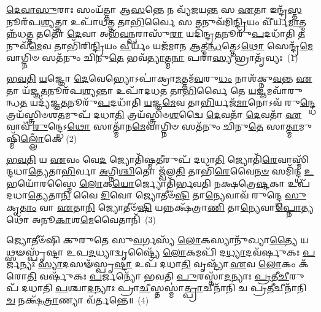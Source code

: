 \setcounter{anuvakam}{0}
\-\ul{𑌦𑍇}\-\-\ul{𑌵𑌾}\-\-\ul{𑌸𑍁}\-𑌰𑌾𑌃 𑌸𑌂𑌯᳴𑌤𑍍𑌤𑌾 𑌆\-\ul{𑌸}\-𑌨𑍍𑌤𑍇 𑌨 𑌵𑍍𑌯᳴𑌜𑌯\-\ul{𑌨𑍍𑌤} 𑌸 \ul{𑌏}\-𑌤𑌾 𑌇𑌨𑍍𑌦𑍍𑌰᳴\-\ul{𑌸𑍍𑌤}\-𑌨𑍂𑌰᳴𑌪\-\ul{𑌶𑍍𑌯}\-𑌤𑍍𑌤𑌾 𑌉𑌪𑌾᳴𑌧\-\ul{𑌤𑍍𑌤} 𑌤𑌾\-\ul{𑌭𑌿}\-𑌰𑍍𑌵𑍈 𑌸 \ul{𑌤}\-𑌨𑍁𑌵᳴𑌮𑌿\-\ul{𑌨𑍍𑌦𑍍𑌰𑌿}\-𑌯𑌂 𑌵𑍀᳴𑌰𑍍𑌯\-\ul{𑌮𑌾}\-𑌤𑍍𑌮𑌨𑍍𑌨᳴𑌧\-\ul{𑌤𑍍𑌤} 𑌤𑌤𑍋᳴ \ul{𑌦𑍇}\-𑌵𑌾 𑌅𑌭᳴\-\ul{𑌵}\-𑌨𑍍𑌪𑌰𑌾𑌸𑍁᳴\-\ul{𑌰𑌾} 𑌯𑌦𑌿᳴𑌨𑍍𑌦𑍍𑌰\-\ul{𑌤}\-𑌨𑍂𑌰𑍁᳴\-\ul{𑌪}\-𑌦𑌧𑌾᳴𑌤𑌿 \ul{𑌤}\-𑌨𑍁𑌵᳴\-\ul{𑌮𑍇}\-𑌵 𑌤𑌾𑌭𑌿᳴𑌰𑌿\-\ul{𑌨𑍍𑌦𑍍𑌰𑌿}\-𑌯𑌂 \ul{𑌵𑍀}\-𑌰𑍍𑌯𑌂᳴ 𑌯𑌜᳴𑌮𑌾𑌨 \ul{𑌆}\-𑌤𑍍𑌮\-\ul{𑌨𑍍𑌧}\-𑌤𑍍𑌤𑍇\-𑌽\-\ul{𑌥𑍋} 𑌸𑍇𑌨𑍍𑌦𑍍𑌰᳴\-\ul{𑌮𑍇}\-𑌵𑌾𑌗𑍍𑌨𑌿𑍞 𑌸𑌤᳴𑌨𑍁𑌂 𑌚𑌿𑌨𑍁\-\ul{𑌤𑍇} 𑌭𑌵᳴\-\ul{𑌤𑍍𑌯𑌾}\-𑌤𑍍𑌮\-\ul{𑌨𑌾} 𑌪𑌰𑌾॑\-\ul{𑌸𑍍𑌯} 𑌭𑍍𑌰𑌾𑌤𑍃᳴𑌵𑍍𑌯𑌃~(1)

\-\ul{𑌭}\-\-\ul{𑌵}\-\-\ul{𑌤𑌿} \ul{𑌯}\-𑌜𑍍𑌞𑍋 \ul{𑌦𑍇}\-𑌵𑍇𑌭𑍍𑌯𑍋\-𑌽𑌪𑌾॑𑌕𑍍𑌰𑌾\-\ul{𑌮}\-𑌤𑍍𑌤𑌮᳴\-\ul{𑌵}\-𑌰𑍁\-\ul{𑌧𑌂} 𑌨𑌾𑌶᳴𑌕𑍍𑌨𑍁\-\ul{𑌵}\-𑌨𑍍𑌤 \ul{𑌏}\-𑌤𑌾 𑌯᳴𑌜𑍍𑌞\-\ul{𑌤}\-𑌨𑍂𑌰᳴𑌪\-\ul{𑌶𑍍𑌯}\-𑌨𑍍𑌤𑌾 𑌉𑌪𑌾᳴𑌦𑌧\-\ul{𑌤} 𑌤𑌾\-\ul{𑌭𑌿}\-𑌰𑍍𑌵𑍈 𑌤𑍇 \ul{𑌯}\-𑌜𑍍𑌞𑌮𑌵𑌾᳴𑌰𑍁𑌨𑍍𑌧\-\ul{𑌤} 𑌯𑌦𑍍𑌯᳴𑌜𑍍𑌞\-\ul{𑌤}\-𑌨𑍂𑌰𑍁᳴\-\ul{𑌪}\-𑌦𑌧𑌾᳴𑌤𑌿 \ul{𑌯}\-𑌜𑍍𑌞\-\ul{𑌮𑍇}\-𑌵 𑌤𑌾\-\ul{𑌭𑌿}\-𑌰𑍍𑌯𑌜᳴\-\ul{𑌮𑌾}\-𑌨𑍋\-𑌽𑌵᳴ 𑌰𑍁\-\ul{𑌨𑍍𑌦𑍍𑌧𑍇} 𑌤𑍍𑌰𑌯᳴𑌸𑍍𑌤𑍍𑌰𑌿𑍞𑌶\-\ul{𑌤}\-𑌮𑍁𑌪᳴ 𑌦𑌧𑌾\-\ul{𑌤𑌿} 𑌤𑍍𑌰𑌯᳴𑌸𑍍𑌤𑍍𑌰𑌿𑍞\-\ul{𑌶}\-𑌦𑍍𑌵𑍈 \ul{𑌦𑍇}\-𑌵𑌤𑌾᳴ \ul{𑌦𑍇}\-𑌵𑌤𑌾᳴ \ul{𑌏}\-𑌵𑌾𑌵᳴ \ul{𑌰𑍁}\-𑌨𑍍𑌦𑍍𑌧𑍇\-𑌽\-\ul{𑌥𑍋} 𑌸𑌾𑌤𑍍𑌮𑌾᳴𑌨\-\ul{𑌮𑍇}\-𑌵𑌾𑌗𑍍𑌨𑌿𑍞 𑌸𑌤᳴𑌨𑍁𑌂 𑌚𑌿𑌨𑍁\-\ul{𑌤𑍇} 𑌸𑌾\-\ul{𑌤𑍍𑌮𑌾}\-𑌮𑍁𑌷𑍍𑌮𑌿᳴\-\ul{𑌲𑍍𑌲𑍋𑌁}\-𑌕𑍇~(2)

\-\ul{𑌭}\-\-\ul{𑌵}\-\-\ul{𑌤𑌿} 𑌯 \ul{𑌏}\-𑌵𑌂 𑌵𑍇\-\ul{𑌦} 𑌜𑍍𑌯𑍋𑌤𑌿᳴𑌷𑍍𑌮\-\ul{𑌤𑍀}\-𑌰𑍁𑌪᳴ 𑌦𑌧𑌾\-\ul{𑌤𑌿} 𑌜𑍍𑌯𑍋𑌤𑌿᳴\-\ul{𑌰𑍇}\-𑌵𑌾𑌸𑍍𑌮𑌿᳴𑌨𑍍𑌦𑌧𑌾\-\ul{𑌤𑍍𑌯𑍇}\-𑌤𑌾\-\ul{𑌭𑌿}\-𑌰𑍍𑌵𑌾 \ul{𑌅}\-𑌗𑍍𑌨𑌿\-\ul{𑌶𑍍𑌚𑌿}\-𑌤𑍋 𑌜𑍍𑌵᳴𑌲\-\ul{𑌤𑌿} 𑌤𑌾𑌭𑌿᳴\-\ul{𑌰𑍇}\-𑌵𑍈\-\ul{𑌨}\-\-\ul{𑍞} 𑌸𑌮𑌿᳴𑌨𑍍𑌦𑍍𑌧 \ul{𑌉}\-𑌭𑌯𑍋᳴𑌰𑌸𑍍𑌮𑍈 \ul{𑌲𑍋}\-𑌕\-\ul{𑌯𑍋}\-𑌰𑍍𑌜𑍍𑌯𑍋𑌤𑌿᳴𑌰𑍍𑌭𑌵𑌤𑌿 𑌨𑌕𑍍𑌷𑌤𑍍𑌰𑍇\-\ul{𑌷𑍍𑌟}\-𑌕𑌾 𑌉𑌪᳴ 𑌦𑌧𑌾\-\ul{𑌤𑍍𑌯𑍇}\-𑌤𑌾\-\ul{𑌨𑌿} 𑌵𑍈 \ul{𑌦𑌿}\-𑌵𑍋 𑌜𑍍𑌯𑍋𑌤𑍀𑍞᳴\-\ul{𑌷𑌿} 𑌤𑌾\-\ul{𑌨𑍍𑌯𑍇}\-𑌵𑌾𑌵᳴ 𑌰𑍁𑌨𑍍𑌦𑍍𑌧𑍇 \ul{𑌸𑍁}\-𑌕𑍃\-\ul{𑌤𑌾𑌂} 𑌵𑌾 \ul{𑌏}\-𑌤𑌾\-\ul{𑌨𑌿} 𑌜𑍍𑌯𑍋𑌤𑍀𑍞᳴\-\ul{𑌷𑌿} 𑌯𑌨𑍍𑌨𑌕𑍍𑌷᳴𑌤𑍍𑌰𑌾\-\ul{𑌣𑌿} 𑌤𑌾\-\ul{𑌨𑍍𑌯𑍇}\-𑌵𑌾\-\ul{𑌪𑍍𑌨𑍋}\-𑌤𑍍𑌯𑌥𑍋᳴ 𑌅𑌨𑍂\-\ul{𑌕𑌾}\-𑌶\-\ul{𑌮𑍇}\-𑌵𑍈𑌤𑌾𑌨𑌿᳴~(3)

𑌜𑍍𑌯𑍋𑌤𑍀𑍞᳴𑌷𑌿 𑌕𑍁𑌰𑍁𑌤𑍇 𑌸𑍁\-\ul{𑌵}\-𑌰𑍍𑌗𑌸𑍍𑌯᳴ \ul{𑌲𑍋}\-𑌕𑌸𑍍𑌯𑌾𑌨𑍁᳴𑌖𑍍𑌯𑌾\-\ul{𑌤𑍍𑌯𑍈} 𑌯𑌥𑍍𑌸𑍟𑌸𑍍𑌪𑍃᳴𑌷𑍍𑌟𑌾 𑌉𑌪\-\ul{𑌦}\-𑌧𑍍𑌯𑌾𑌦𑍍𑌵𑍃𑌷𑍍𑌟𑍍𑌯𑍈᳴ \ul{𑌲𑍋}\-𑌕𑌮𑌪𑌿᳴ 𑌦\-\ul{𑌧𑍍𑌯𑌾}\-𑌦𑌵᳴𑌰𑍍\mbox{}𑌷𑍁𑌕𑌃 \ul{𑌪}\-𑌰𑍍𑌜𑌨𑍍𑌯𑌃᳴ \ul{𑌸𑍍𑌯𑌾}\-𑌦𑌸𑍟᳴𑌸𑍍𑌪𑍃\-\ul{𑌷𑍍𑌟𑌾} 𑌉𑌪᳴ 𑌦𑌧𑌾\-\ul{𑌤𑌿} 𑌵𑍃𑌷𑍍𑌟𑍍𑌯𑌾᳴ \ul{𑌏}\-𑌵 \ul{𑌲𑍋}\-𑌕𑌂 𑌕᳴𑌰𑍋\-\ul{𑌤𑌿} 𑌵𑌰𑍍\mbox{}𑌷𑍁᳴𑌕𑌃 \ul{𑌪}\-𑌰𑍍𑌜𑌨𑍍𑌯𑍋᳴ 𑌭𑌵𑌤𑌿 \ul{𑌪𑍁}\-𑌰𑌸𑍍𑌤𑌾᳴\-\ul{𑌦}\-𑌨𑍍𑌯𑌾𑌃 \ul{𑌪𑍍𑌰}\-𑌤𑍀\-\ul{𑌚𑍀}\-𑌰𑍁𑌪᳴ 𑌦𑌧𑌾𑌤𑌿 \ul{𑌪}\-𑌶𑍍𑌚𑌾\-\ul{𑌦}\-𑌨𑍍𑌯𑌾𑌃 𑌪𑍍𑌰𑌾\-\ul{𑌚𑍀}\-𑌸𑍍𑌤𑌸𑍍𑌮𑌾॑\-\ul{𑌤𑍍𑌪𑍍𑌰𑌾}\-𑌚𑍀𑌨𑌾᳴𑌨𑌿 𑌚 𑌪𑍍𑌰\-\ul{𑌤𑍀}\-𑌚𑍀𑌨𑌾᳴𑌨𑌿 \ul{𑌚} 𑌨𑌕𑍍𑌷᳴\-\ul{𑌤𑍍𑌰𑌾}\-𑌣𑍍𑌯𑌾 𑌵᳴𑌰𑍍𑌤𑌨𑍍𑌤𑍇॥~(4)

{\anuvakamend[{𑌭𑍍𑌰𑌾𑌤𑍃᳴𑌵𑍍𑌯𑍋 \ul{𑌲𑍋}\-𑌕 \ul{𑌏}\-𑌵𑍈𑌤𑌾𑌨𑍍𑌯𑍇𑌕᳴𑌚𑌤𑍍𑌵𑌾𑌰𑌿𑍞𑌶𑌚𑍍𑌚}]}%


